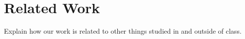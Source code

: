 \section{Related Work}

Explain how our work is related to other things studied in and outside of class.
